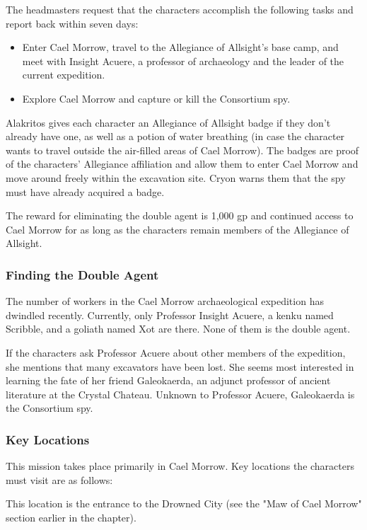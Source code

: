 \documentclass[10pt,a4paper,twoside,twocolumn,openany,nodeprecatedcode]{dndbook}
\begin{document}
The headmasters request that the characters accomplish the following tasks and report back within seven days:


\begin{itemize}
\item Enter Cael Morrow, travel to the Allegiance of Allsight's base camp, and meet with Insight Acuere, a professor of archaeology and the leader of the current expedition.
\item Explore Cael Morrow and capture or kill the Consortium spy.
\end{itemize}

Alakritos gives each character an Allegiance of Allsight badge if they don't already have one, as well as a potion of water breathing (in case the character wants to travel outside the air-filled areas of Cael Morrow). The badges are proof of the characters' Allegiance affiliation and allow them to enter Cael Morrow and move around freely within the excavation site. Cryon warns them that the spy must have already acquired a badge.

The reward for eliminating the double agent is 1,000 gp and continued access to Cael Morrow for as long as the characters remain members of the Allegiance of Allsight.

\subsubsection{Finding the Double Agent}
The number of workers in the Cael Morrow archaeological expedition has dwindled recently. Currently, only Professor Insight Acuere, a kenku named Scribble, and a goliath named Xot are there. None of them is the double agent.

If the characters ask Professor Acuere about other members of the expedition, she mentions that many excavators have been lost. She seems most interested in learning the fate of her friend Galeokaerda, an adjunct professor of ancient literature at the Crystal Chateau. Unknown to Professor Acuere, Galeokaerda is the Consortium spy.

\subsubsection{Key Locations}
This mission takes place primarily in Cael Morrow. Key locations the characters must visit are as follows:


\begin{description}[nolistsep]
\item[Maw of Cael Morrow.]
This location is the entrance to the Drowned City (see the "Maw of Cael Morrow" section earlier in the chapter).
\end{description}
\end{document}

